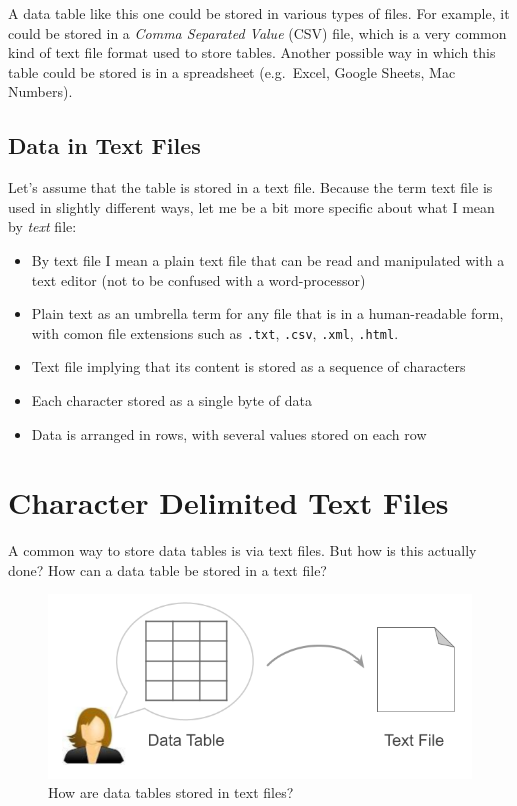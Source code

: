 \documentclass[
]{book}
\begin{document}
A data table like this one could be stored in various types of files. For
example, it could be stored in a \emph{Comma Separated Value} (CSV) file, which is a
very common kind of text file format used to store tables. Another possible way
in which this table could be stored is in a spreadsheet (e.g.~Excel, Google
Sheets, Mac Numbers).

\hypertarget{data-in-text-files}{%
\subsection{Data in Text Files}\label{data-in-text-files}}

Let's assume that the table is stored in a text file. Because the term text
file is used in slightly different ways, let me be a bit more specific about
what I mean by \emph{text} file:

\begin{itemize}
\item
  By text file I mean a plain text file that can be read and manipulated with a
  text editor (not to be confused with a word-processor)
\item
  Plain text as an umbrella term for any file that is in a human-readable form,
  with comon file extensions such as \texttt{.txt}, \texttt{.csv}, \texttt{.xml}, \texttt{.html}.
\item
  Text file implying that its content is stored as a sequence of characters
\item
  Each character stored as a single byte of data
\item
  Data is arranged in rows, with several values stored on each row
\end{itemize}

\hypertarget{character-delimited-text-files}{%
\section{Character Delimited Text Files}\label{character-delimited-text-files}}

A common way to store data tables is via text files. But how is this actually
done? How can a data table be stored in a text file?

\begin{figure}

{\centering \includegraphics[width=0.65\linewidth]{images/inout/table-storing-data} 

}

\caption{How are data tables stored in text files?}\label{fig:unnamed-chunk-360}
\end{figure}
\end{document}
